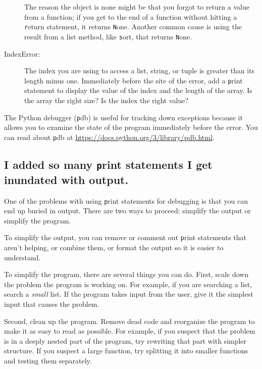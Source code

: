 \documentclass[
DIV=11,
fontsize=13,
twoside,
headinclude=false,
titlepage=firstiscover,
abstract=true,
headsepline=true,
footsepline=true,
chapterprefix=true, %
headings=big,
bibliography=totoc,%
captions=tableheading
]{scrbook}
\theoremstyle{definition}
\begin{document}
\begin{description}
The reason the object is none might be that you forgot
to return a value from a function; if you get to the end of
a function without hitting a {\texttt return} statement, it returns
{\texttt None}.  Another common cause is using the result from
a list method, like {\texttt sort}, that returns {\texttt None}.

\item[IndexError:] The index you are using
to access a list, string, or tuple is greater than
its length minus one.  Immediately before the site of the error,
add a {\texttt print} statement to display
the value of the index and the length of the array.
Is the array the right size?  Is the index the right value?

\end{description}

The Python debugger ({\texttt pdb}) is useful for tracking down
exceptions because it allows you to examine the state of the
program immediately before the error.  You can read
about {\texttt pdb} at \url{https://docs.python.org/3/library/pdb.html}.


\subsection{I added so many {\texttt print} statements I get inundated with
output.}

One of the problems with using {\texttt print} statements for debugging
is that you can end up buried in output.  There are two ways
to proceed: simplify the output or simplify the program.

To simplify the output, you can remove or comment out {\texttt print}
statements that aren't helping, or combine them, or format
the output so it is easier to understand.

To simplify the program, there are several things you can do.  First,
scale down the problem the program is working on.  For example, if you
are searching a list, search a {\em small} list.  If the program takes
input from the user, give it the simplest input that causes the
problem.

Second, clean up the program.  Remove dead code and reorganize the
program to make it as easy to read as possible.  For example, if you
suspect that the problem is in a deeply nested part of the program,
try rewriting that part with simpler structure.  If you suspect a
large function, try splitting it into smaller functions and testing them
separately.
\end{document}
